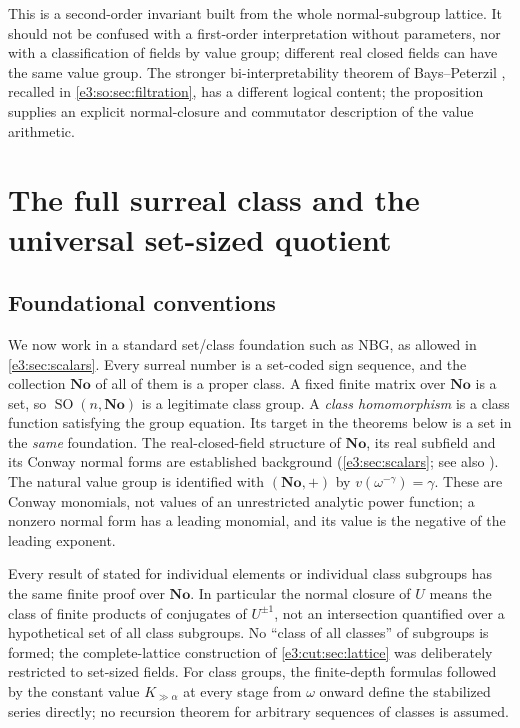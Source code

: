 \documentclass[11pt,letterpaper]{article}
\numberwithin{equation}{section}
\theoremstyle{definition}
\theoremstyle{remark}
\newcommand{\No}{\mathbf{No}}
\newcommand{\SO}{\operatorname{SO}}
\begin{document}
This is a second-order invariant built from the whole normal-subgroup lattice.
It should not be confused with a first-order interpretation without parameters,
nor with a classification of fields by value group; different real closed fields
can have the same value group. The stronger bi-interpretability theorem of
Bays--Peterzil \cite[Theorem~1.1]{BP}, recalled in
\cref{e3:so:sec:filtration}, has a different logical content; the proposition
supplies an explicit normal-closure and commutator description of the value
arithmetic.

\section{The full surreal class and the universal set-sized quotient}\label{e3:cut:sec:class}

\subsection{Foundational conventions}\label{e3:cut:sub:foundations}

We now work in a standard set/class foundation such as NBG, as allowed in
\cref{e3:sec:scalars}. Every surreal number is a set-coded sign sequence, and
the collection $\No$ of all of them is a proper class. A fixed finite matrix
over $\No$ is a set, so $\SO(n,\No)$ is a legitimate class group. A
\emph{class homomorphism} is a class function satisfying the group equation.
Its target in the theorems below is a set in the \emph{same} foundation. The
real-closed-field structure of $\No$, its real subfield and its Conway normal
forms are established background (\cref{e3:sec:scalars}; see also
\cite[Sections~2.2--2.3]{BG}). The natural value group is identified with
$(\No,+)$ by $v(\omega^{-\gamma})=\gamma$. These are Conway monomials, not
values of an unrestricted analytic power function; a nonzero normal form has a
leading monomial, and its value is the negative of the leading exponent.

Every result of
 stated for individual
elements or individual class subgroups has the same finite proof over $\No$. In
particular the normal closure of $U$ means the class of finite products of
conjugates of $U^{\pm1}$, not an intersection quantified over a hypothetical set
of all class subgroups. No ``class of all classes'' of subgroups is formed; the
complete-lattice construction of \cref{e3:cut:sec:lattice} was deliberately
restricted to set-sized fields. For class groups, the finite-depth formulas
followed by the constant value $K_{\gg\alpha}$ at every stage from $\omega$
onward define the stabilized series directly; no recursion theorem for
arbitrary sequences of classes is assumed.
\end{document}
